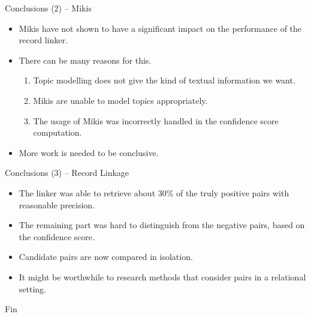 \documentclass[12pt]{beamer}
\theoremstyle{break}
\begin{document}
\begin{frame}{Conclusions (2) -- Mikis}

	\begin{itemize}
		\item Mikis have not shown to have a significant impact on the performance of the record linker.
		\item There can be many reasons for this. \begin{enumerate}
 				\item Topic modelling does not give the kind of textual information we want.
 				\item Mikis are unable to model topics appropriately.
 				\item The usage of Mikis was incorrectly handled in the confidence score computation.
 			\end{enumerate}
 		\item More work is needed to be conclusive.
	\end{itemize}
	
\end{frame}



\begin{frame}{Conclusions (3) -- Record Linkage}

	\begin{itemize}
		\item The linker was able to retrieve about $30\%$ of the truly positive pairs with reasonable precision.
		\item The remaining part was hard to distinguish from the negative pairs, based on the confidence score.
		\item Candidate pairs are now compared in isolation.
		\item It might be worthwhile to research methods that consider pairs in a relational setting.
	\end{itemize}
	
\end{frame}




\begin{frame}

	\vspace*{\fill}
	
	\begin{center}
		\huge Fin
	\end{center}
	
	\vspace*{\fill}
	
\end{frame}
\end{document}
